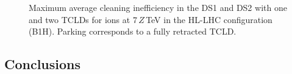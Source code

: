 \begin{figure}[t]
  \centering
  \caption{Maximum average cleaning inefficiency in the DS1 and DS2 with one and two TCLDs for \lead ions at 7$\,Z\,$TeV in the HL-LHC configuration (B1H). Parking corresponds to a fully retracted TCLD.}  
  \label{pic:16091422}
  \end{figure}



\newpage
\subsection{Conclusions}





